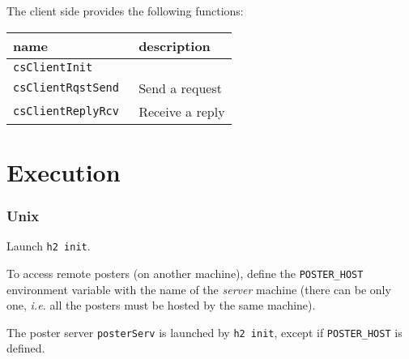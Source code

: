 The client side provides the following functions:

\begin{center}\small\begin{tabularx}{\linewidth}{|l|X|}
\hline
name		& description \\
\hline
\tt csClientInit 	& \\
\tt csClientRqstSend 	& Send a request\\
\tt csClientReplyRcv 	& Receive a reply\\
\hline
\end{tabularx}\end{center}


\section{Execution}

\subsubsection{Unix} Launch \texttt{h2 init}.

To  access   remote posters   (on  another  machine),  define    the 
\texttt{POSTER\_HOST} environment  variable  with the  name  of the \emph{server}
machine (there can be only one, \emph{i.e.} all the posters must be hosted
by the same machine).

The  poster server \texttt{posterServ} is  launched by \texttt{h2 init}, except
if \texttt{POSTER\_HOST} is defined.

